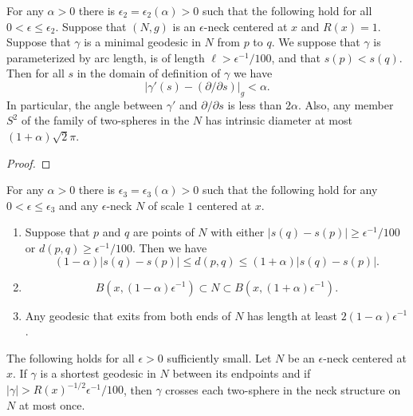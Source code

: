 \begin{lemma}
\label{lem:neck-geodesic-directions}
\label{directions}
 For any $\alpha>0$  there is $\epsilon_2=\epsilon_2(\alpha)>0$
such that the following hold for all $0<\epsilon\le \epsilon_2$.
Suppose that $(N,g)$ is an $\epsilon$-neck centered at $x$ and
$R(x)=1$. Suppose that $\gamma$ is a minimal geodesic in  $N$ from
$p$ to $q$. We suppose that $\gamma$ is parameterized by arc length,
is of length $\ell>\epsilon^{-1}/100$, and that $s(p)<s(q)$. Then
for all $s$ in the domain of definition of $\gamma$ we have
$$|\gamma'(s)-(\partial/\partial s)|_g<\alpha.$$
 In particular, the angle between $\gamma'$ and $\partial/\partial
s$ is less than $2\alpha$.
 Also,  any
member $S^2$ of the family of two-spheres in the $N$ has intrinsic
diameter at most $(1+\alpha)\sqrt{2}\pi$.
\end{lemma}

\begin{proof}
\sketch
\end{proof}


\begin{corollary}
\label{cor:neck-distance-estimates}
\label{neckgeo}
For any $\alpha>0$ there is $\epsilon_3=\epsilon_3(\alpha)>0$ such
that the  following hold for any $0<\epsilon\le \epsilon_3$ and any
$\epsilon$-neck $N$ of scale $1$ centered at $x$.
\begin{enumerate}
\item[(1)] Suppose that $p$ and $q$ are points of  $N$
with either $|s(q)-s(p)|\ge \epsilon^{-1}/100$ or $d(p,q)\ge
\epsilon^{-1}/100$. Then  we have
$$(1-\alpha)|s(q)-s(p)|\le d(p,q)\le (1+\alpha)|s(q)-s(p)|.$$
\item[(2)]
$$B(x,(1-\alpha)\epsilon^{-1})\subset
N\subset B(x,(1+\alpha)\epsilon^{-1}).$$
\item[(3)] Any geodesic that exits from both ends of $N$ has length at least $2(1-\alpha)
\epsilon^{-1}$.\end{enumerate}
\end{corollary}



\begin{corollary}
\label{cor:shortest-geodesic-crosses-neck-once}
\label{compint}
The following holds for all $\epsilon>0$ sufficiently small. Let $N$
be an $\epsilon$-neck centered at $x$. If $\gamma$ is a shortest
geodesic in $N$ between its endpoints and if
$|\gamma|>R(x)^{-1/2}\epsilon^{-1}/100$, then $\gamma$ crosses each
two-sphere in the neck structure on $N$ at most once.
\end{corollary}






